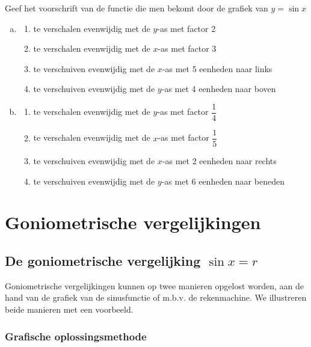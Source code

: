 \documentclass[a4paper,12pt]{article}
\begin{document}
\begin{oefening}Geef het voorschrift van de functie die men bekomt door de grafiek van $y=\sin x$
  \begin{enumerate}[(a)]
    \item
    \begin{enumerate}[$\rightarrow$]
      \itemsep0.8em
      \item te verschalen evenwijdig met de $y$-as met factor 2
      \item te verschalen evenwijdig met de $x$-as met factor 3
      \item te verschuiven evenwijdig met de $x$-as met 5 eenheden naar links
      \item te verschuiven evenwijdig met de $y$-as met 4 eenheden naar boven
    \end{enumerate}
    \item 
    \begin{enumerate}[$\rightarrow$]
      \itemsep0.8em
      \item te verschalen evenwijdig met de $y$-as met factor $\dfrac{1}{4}$
      \item te verschalen evenwijdig met de $x$-as met factor $\dfrac{1}{5}$
      \item te verschuiven evenwijdig met de $x$-as met 2 eenheden naar rechts
      \item te verschuiven evenwijdig met de $y$-as met 6 eenheden naar beneden
    \end{enumerate}
  \end{enumerate}
\end{oefening}

\pagebreak
\section{Goniometrische vergelijkingen}

\subsection{De goniometrische vergelijking $\sin x=r$}
Goniometrische vergelijkingen kunnen op twee manieren opgelost worden, aan de hand van de grafiek van de sinusfunctie of m.b.v. de rekenmachine. We illustreren beide manieren met een voorbeeld.

\subsubsection{Grafische oplossingsmethode}
\end{document}
